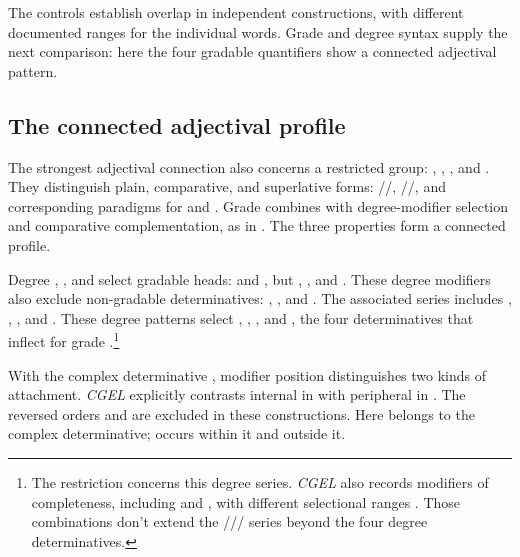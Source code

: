 \documentclass[12pt]{article}
\begin{document}
The controls establish overlap in independent constructions, with different documented ranges for the individual words. Grade and degree syntax supply the next comparison: here the four gradable quantifiers show a connected adjectival pattern.

\subsection{The connected adjectival profile}\label{sec:adjectival-profile}

The strongest adjectival connection also concerns a restricted group: , , , and . They distinguish plain, comparative, and superlative forms: /\allowbreak{}/\allowbreak{}, /\allowbreak{}/\allowbreak{}, and corresponding paradigms for  and  \citep[391--395]{huddleston2002}. Grade combines with degree-modifier selection and comparative complementation, as in . The three properties form a connected profile.

Degree , , and  select gradable heads:  and , but , , and . These degree modifiers also exclude non-gradable determinatives: , , and . The associated series includes , , , and . These degree patterns select , , , and , the four determinatives that inflect for grade \citep[393--395, 431--432]{huddleston2002}.\footnote{The restriction concerns this degree series. \textit{CGEL} also records modifiers of completeness, including  and , with different selectional ranges \citep[432]{huddleston2002}. Those combinations don't extend the /// series beyond the four degree determinatives.}

With the complex determinative , modifier position distinguishes two kinds of attachment. \textit{CGEL} explicitly contrasts internal  in  with peripheral  in  \citep[p.~392, (61)]{huddleston2002}. The reversed orders  and  are excluded in these constructions. Here  belongs to the complex determinative;  occurs within it and  outside it.
\end{document}
